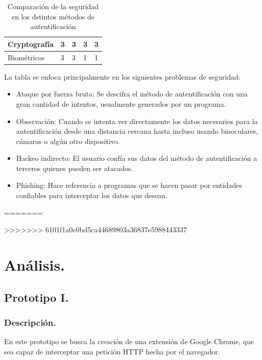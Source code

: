 \documentclass[12pt, a4paper, titlepage]{article}
\begin{document}
\begin{table}[htb]
{\begin{tabular}{l|l|l|l|l|}
					\multicolumn{1}{|l|}{Cryptografía}                                                     & 3                                                                 & 3           & 3                                                          & 3        \\ \hline
					\multicolumn{1}{|l|}{Biométricos}                                                      & 3                                                                 & 3           & 1                                                          & 1        \\ \hline
				\end{tabular}
			}
			\caption{Comparación de la seguridad en los dstintos métodos de autentificación}
		\end{table}
		La tabla se enfoca principalmente en los siguientes problemas de seguridad: 
		
		\begin{itemize}
			\item Ataque por fuerza bruta: Se descifra el método de autentificación con una gran cantidad de intentos, usualmente generados por un programa.
			\item Observación: Cuando se intenta ver directamente los datos necesarios para la autentificación desde una distancia cercana hasta incluso usando binoculares, cámaras o algún otro dispositivo.
			\item Hackeo indirecto: El usuario confía sus datos del método de autentificación a terceros quienes pueden ser atacados. 
			\item Phishing: Hace referencia a programas que se hacen pasar por entidades confiables para interceptar los datos que desean.
		\end{itemize}
	\newpage
=======
	
>>>>>>> 6101f1a0c0bd5ca44689803a36837e5988443337
	\section{\textcolor{azulescom}{Análisis.}}
		\subsection{Prototipo I.}
			\subsubsection{Descripción.}
				En este prototipo se busca la creación de una extensión de Google Chrome, que sea capaz de interceptar una petición HTTP hecha por el navegador.
\end{document}
